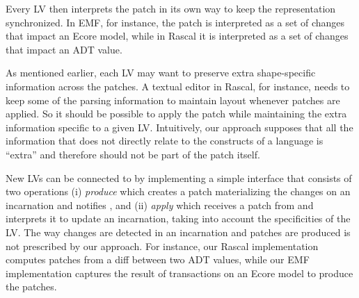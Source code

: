 
Every LV then interprets the patch in its own way to keep the representation synchronized.
In EMF, for instance, the patch is interpreted as a set of changes that impact an Ecore model, while in Rascal it is interpreted as a set of changes that impact an ADT value.

As mentioned earlier, each LV may want to preserve extra shape-specific information across the patches.
A textual editor in Rascal, for instance, needs to keep some of the parsing information to maintain layout whenever patches are applied.
So it should be possible to apply the patch while maintaining the extra information specific to a given LV.
Intuitively, our approach supposes that all the information that does not directly relate to the constructs of a language is ``extra'' and therefore should not be part of the patch itself.


New LVs can be connected to \prism by implementing a simple interface that consists of two operations (i) \emph{produce} which creates a patch materializing the changes on an incarnation and notifies \prism, and (ii) \emph{apply} which receives a patch from \prism and interprets it to update an incarnation, taking into account the specificities of the LV.
The way changes are detected in an incarnation and patches are produced is not prescribed by our approach.
For instance, our Rascal implementation computes patches from a diff between two ADT values, while our EMF implementation captures the result of transactions on an Ecore model to produce the patches.

